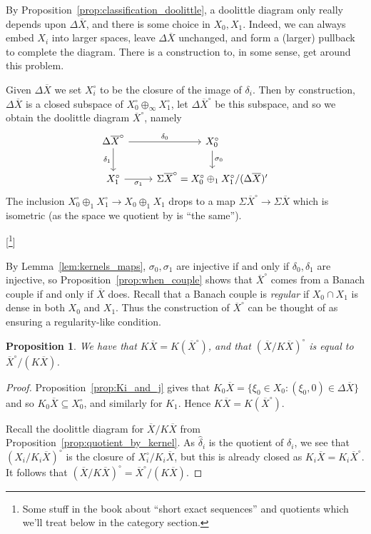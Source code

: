 \documentclass[a4paper,11pt]{article}
\theoremstyle{plain}
\newtheorem{proposition}{Proposition}[section]
\theoremstyle{remark}
\begin{document}
By Proposition~\ref{prop:classification_doolittle}, a doolittle diagram only really depends upon $\Delta\overline X$, and there is some choice in $X_0,X_1$.  Indeed, we can always embed $X_i$ into larger spaces, leave $\Delta\overline X$ unchanged, and form a (larger) pullback to complete the diagram.  There is a construction to, in some sense, get around this problem.

Given $\Delta\overline X$ we set $X_i^\circ$ to be the closure of the image of $\delta_i$.  Then by construction, $\Delta\overline X$ is a closed subspace of $X_0^\circ \oplus_\infty X_1^\circ$, let $\Delta\overline X^\circ$ be this subspace, and so we obtain the doolittle diagram $\overline X^\circ$, namely
\[ \begin{tikzcd}
\Delta\overline X^\circ \arrow[r, "\delta_0"] \arrow[d, "\delta_1"'] & X_0^\circ \arrow[d, "\sigma_0"] \\
X_1^\circ \arrow[r, "\sigma_1"'] & \Sigma\overline X^\circ = X_0^\circ \oplus_1 X_1^\circ / (\Delta\overline X)'
\end{tikzcd} \]
The inclusion $X_0^\circ \oplus_1 X_1^\circ \to X_0\oplus_1 X_1$ drops to a map $\Sigma\overline X^\circ \to \Sigma\overline X$ which is isometric (as the space we quotient by is ``the same'').

[\footnote{Some stuff in the book about ``short exact sequences'' and quotients which we'll treat below in the category section.}]

By Lemma~\ref{lem:kernels_maps}, $\sigma_0,\sigma_1$ are injective if and only if $\delta_0,\delta_1$ are injective, so Proposition~\ref{prop:when_couple} shows that $\overline X^\circ$ comes from a Banach couple if and only if $\overline X$ does.  Recall that a Banach couple is \emph{regular} if $X_0\cap X_1$ is dense in both $X_0$ and $X_1$.  Thus the construction of $\overline X^\circ$ can be thought of as ensuring a regularity-like condition.

\begin{proposition}
We have that $K\overline X = K(\overline X^\circ)$, and that $(\overline X / K\overline X)^\circ$ is equal to $\overline X^\circ / (K\overline X)$.
\end{proposition}
\begin{proof}
Proposition~\ref{prop:Ki_and_j} gives that $K_0\overline X = \{ \xi_0\in X_0 : (\xi_0,0) \in \Delta\overline X \}$ and so $K_0\overline X \subseteq X_0^\circ$, and similarly for $K_1$.  Hence $K\overline X = K(\overline X^\circ)$.

Recall the doolittle diagram for $\overline X / K\overline X$ from Proposition~\ref{prop:quotient_by_kernel}.  As $\hat\delta_i$ is the quotient of $\delta_i$, we see that $(X_i / K_i\overline X)^\circ$ is the closure of $X_i^\circ / K_i\overline X$, but this is already closed as $K_i\overline X = K_i\overline X^\circ$.  It follows that $(\overline X / K\overline X)^\circ = \overline X^\circ / (K\overline X)$.
\end{proof}
\end{document}
